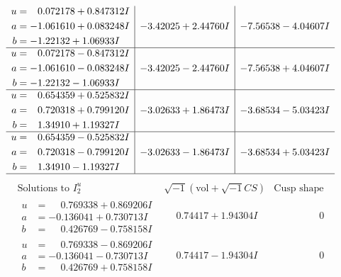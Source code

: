 \documentclass[1p]{elsarticle_modified}
\theoremstyle{definition}
\newcommand{\I}{\sqrt{-1}}
\begin{document}
$$\begin{array}{c|c|c}
\begin{aligned}
u &= \phantom{-}0.072178 + 0.847312 I \\
a &= -1.061610 + 0.083248 I \\
b &= -1.22132 + 1.06933 I\end{aligned}
 & -3.42025 + 2.44760 I & -7.56538 - 4.04607 I \\ \hline\begin{aligned}
u &= \phantom{-}0.072178 - 0.847312 I \\
a &= -1.061610 - 0.083248 I \\
b &= -1.22132 - 1.06933 I\end{aligned}
 & -3.42025 - 2.44760 I & -7.56538 + 4.04607 I \\ \hline\begin{aligned}
u &= \phantom{-}0.654359 + 0.525832 I \\
a &= \phantom{-}0.720318 + 0.799120 I \\
b &= \phantom{-}1.34910 + 1.19327 I\end{aligned}
 & -3.02633 + 1.86473 I & -3.68534 - 5.03423 I \\ \hline\begin{aligned}
u &= \phantom{-}0.654359 - 0.525832 I \\
a &= \phantom{-}0.720318 - 0.799120 I \\
b &= \phantom{-}1.34910 - 1.19327 I\end{aligned}
 & -3.02633 - 1.86473 I & -3.68534 + 5.03423 I\\
 \hline 
 \end{array}$$\newpage$$\begin{array}{c|c|c}  
\text{Solutions to }I^u_{2}& \I (\text{vol} + \sqrt{-1}CS) & \text{Cusp shape}\\
 \hline 
\begin{aligned}
u &= \phantom{-}0.769338 + 0.869206 I \\
a &= -0.136041 + 0.730713 I \\
b &= \phantom{-}0.426769 - 0.758158 I\end{aligned}
 & \phantom{-}0.74417 + 1.94304 I & \phantom{-0.000000 } 0 \\ \hline\begin{aligned}
u &= \phantom{-}0.769338 - 0.869206 I \\
a &= -0.136041 - 0.730713 I \\
b &= \phantom{-}0.426769 + 0.758158 I\end{aligned}
 & \phantom{-}0.74417 - 1.94304 I & \phantom{-0.000000 } 0 \\ \hline\begin{aligned}

\end{aligned}
\end{array}$$
\end{document}

